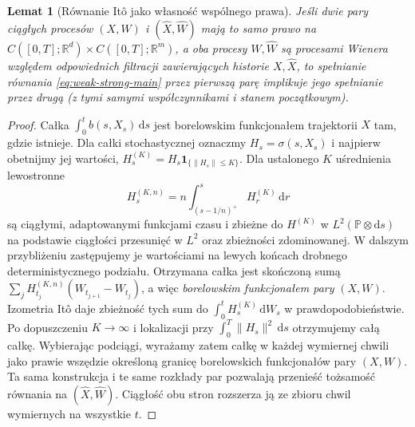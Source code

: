 \documentclass[11pt,a4paper,oneside]{report}
\numberwithin{equation}{chapter}
\theoremstyle{plain}
\newtheorem{lemat}[twierdzenie]{Lemat}
\theoremstyle{definition}
\theoremstyle{remark}
\newcommand{\R}{\mathbb{R}}
\newcommand{\Prob}{\mathbb{P}}
\newcommand{\ind}[1]{\mathbf{1}_{#1}}
\newcommand{\dd}{\mathrm{d}}
\begin{document}
\begin{lemat}[Równanie Itô jako własność wspólnego prawa]
\label{lem:YW-transfer}
Jeśli dwie pary ciągłych procesów $(X,W)$ i
$(\widehat X,\widehat W)$ mają to samo prawo na
$C([0,T];\R^d)\times C([0,T];\R^m)$, a oba procesy
$W,\widehat W$ są procesami Wienera względem odpowiednich
filtracji zawierających historie $X,\widehat X$, to
spełnianie równania \eqref{eq:weak-strong-main} przez
pierwszą parę implikuje jego spełnianie przez drugą
(z tymi samymi współczynnikami i stanem początkowym).
\end{lemat}
\begin{proof}
Całka $\int_0^t b(s,X_s)\,\dd s$ jest borelowskim
funkcjonałem trajektorii $X$ tam, gdzie istnieje.
Dla całki stochastycznej oznaczmy
$H_s=\sigma(s,X_s)$ i najpierw obetnijmy jej wartości,
$H_s^{(K)}=H_s\ind{\{\|H_s\|\le K\}}$.
Dla ustalonego $K$ uśrednienia lewostronne
\[
 H_s^{(K,n)}=n\int_{(s-1/n)^+}^{s}H_r^{(K)}\,\dd r
\]
są ciągłymi, adaptowanymi funkcjami czasu i zbieżne do
$H^{(K)}$ w $L^2(\Prob\otimes\dd s)$ na podstawie
ciągłości przesunięć w $L^2$ oraz zbieżności zdominowanej.
W dalszym przybliżeniu zastępujemy je wartościami na
lewych końcach drobnego deterministycznego podziału.
Otrzymana całka jest skończoną sumą
$\sum_j H_{t_j}^{(K,n)}(W_{t_{j+1}}-W_{t_j})$,
a więc \emph{borelowskim funkcjonałem pary} $(X,W)$.
Izometria Itô daje zbieżność tych sum do
$\int_0^tH_s^{(K)}\,\dd W_s$ w prawdopodobieństwie.
Po dopuszczeniu $K\to\infty$ i lokalizacji przy
$\int_0^T\|H_s\|^2\,\dd s$ otrzymujemy całą całkę.
Wybierając podciągi, wyrażamy zatem całkę w każdej
wymiernej chwili jako prawie wszędzie określoną granicę
borelowskich funkcjonałów pary $(X,W)$.
Ta sama konstrukcja i te same rozkłady par pozwalają
przenieść tożsamość równania na $(\widehat X,\widehat W)$.
Ciągłość obu stron rozszerza ją ze zbioru chwil wymiernych
na wszystkie $t$.
\end{proof}
\end{document}
